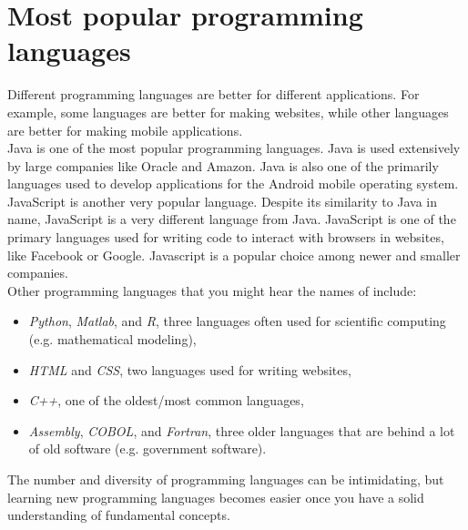 \section{Most popular programming languages}

Different programming languages are better for different applications. For example, some languages are better for making websites, while other languages are better for making mobile applications. \\

Java is one of the most popular programming languages. Java is used extensively by large companies like Oracle and Amazon. Java is also one of the primarily languages used to develop applications for the Android mobile operating system. \\

JavaScript is another very popular language. Despite its similarity to Java in name, JavaScript is a very different language from Java. JavaScript is one of the primary languages used for writing code to interact with browsers in websites, like Facebook or Google. 
Javascript is a popular choice among newer and smaller companies. \\

Other programming languages that you might hear the names of include:
\begin{itemize}
\item \emph{Python}, \emph{Matlab}, and \emph{R}, three languages often used for scientific computing (e.g. mathematical modeling),
\item \emph{HTML} and \emph{CSS}, two languages used for writing websites,
\item \emph{C++}, one of the oldest/most common languages,
\item \emph{Assembly}, \emph{COBOL}, and \emph{Fortran}, three older languages that are behind a lot of old software (e.g. government software).
\end{itemize} 

The number and diversity of programming languages can be intimidating, but learning new programming languages becomes easier once you have a solid understanding of fundamental concepts. 

